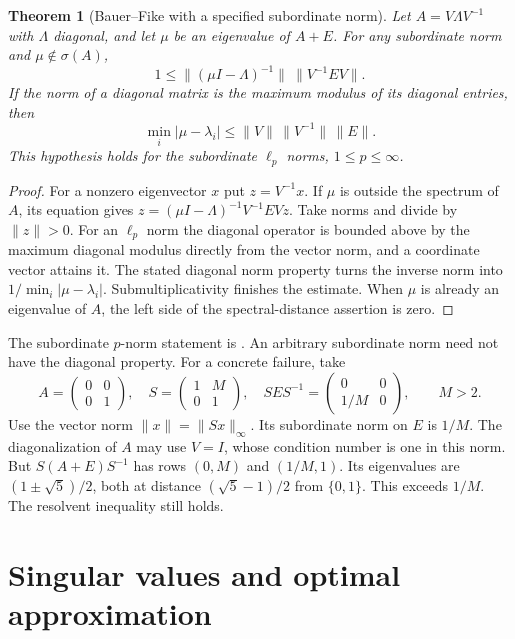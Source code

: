 \documentclass[11pt,oneside,openany]{book}
\theoremstyle{plain}
\newtheorem{theorem}{Theorem}[chapter]
\theoremstyle{definition}
\theoremstyle{remark}
\begin{document}
\begin{theorem}[Bauer--Fike with a specified subordinate norm]
\label{p206:W39}
Let \(A=V\Lambda V^{-1}\) with \(\Lambda\) diagonal, and let
\(\mu\) be an eigenvalue of \(A+E\).
For any subordinate norm and \(\mu\notin\sigma(A)\),
\[
 1\le\|(\mu I-\Lambda)^{-1}\|\ \|V^{-1}EV\|.
\]
If the norm of a diagonal matrix is the maximum modulus of its
diagonal entries, then
\[
      \min_i|\mu-\lambda_i|\le\|V\|\,\|V^{-1}\|\,\|E\|.
\]
This hypothesis holds for the subordinate \(\ell_p\) norms,
\(1\le p\le\infty\).
\end{theorem}
\begin{proof}
For a nonzero eigenvector \(x\) put \(z=V^{-1}x\).
If \(\mu\) is outside the spectrum of \(A\), its equation
gives \(z=(\mu I-\Lambda)^{-1}V^{-1}EVz\).
Take norms and divide by \(\|z\|>0\).
For an \(\ell_p\) norm the diagonal operator is bounded above
by the maximum diagonal modulus directly from the vector norm,
and a coordinate vector attains it. The stated diagonal norm
property turns the inverse norm into
\(1/\min_i|\mu-\lambda_i|\). Submultiplicativity finishes the
estimate. When \(\mu\) is already an eigenvalue of \(A\),
the left side of the spectral-distance assertion is zero.
\end{proof}
The subordinate \(p\)-norm statement is \cite[Theorem 7.2.2]{golub}.
An arbitrary subordinate norm need not have the diagonal property.
For a concrete failure, take
\[
 A=\begin{pmatrix}0&0\\0&1\end{pmatrix},\quad
 S=\begin{pmatrix}1&M\\0&1\end{pmatrix},\quad
 SES^{-1}=\begin{pmatrix}0&0\\1/M&0\end{pmatrix},\qquad M>2.
\]
Use the vector norm \(\|x\|=\|Sx\|_\infty\). Its subordinate
norm on \(E\) is \(1/M\). The diagonalization of \(A\)
may use \(V=I\), whose condition number is one in this norm.
But \(S(A+E)S^{-1}\) has rows \((0,M)\) and \((1/M,1)\).
Its eigenvalues are \((1\pm\sqrt5)/2\), both at distance
\((\sqrt5-1)/2\) from \(\{0,1\}\).
This exceeds \(1/M\). The resolvent inequality still holds.

\section{Singular values and optimal approximation}
\end{document}
